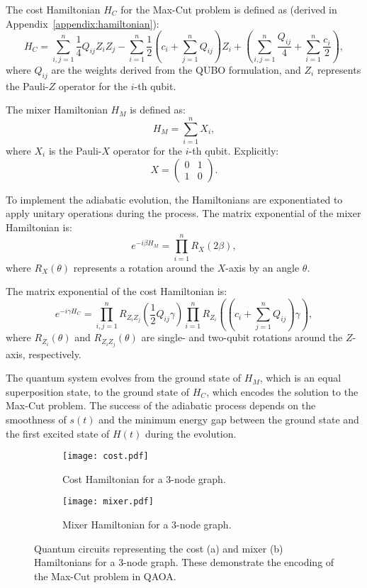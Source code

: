 \documentclass[12pt]{article}
\begin{document}
The cost Hamiltonian \( H_C \) for the Max-Cut problem is defined as (derived in Appendix~\ref{appendix:hamiltonian}):
\[
H_C = \sum_{i,j=1}^{n} \frac{1}{4} Q_{ij} Z_i Z_j 
- \sum_{i=1}^{n} \frac{1}{2} \left( c_i + \sum_{j=1}^{n} Q_{ij} \right) Z_i 
+ \left( \sum_{i,j=1}^{n} \frac{Q_{ij}}{4} + \sum_{i=1}^{n} \frac{c_i}{2} \right),
\]
where \( Q_{ij} \) are the weights derived from the QUBO formulation, and \( Z_i \) represents the Pauli-\( Z \) operator for the \( i \)-th qubit.



The mixer Hamiltonian \( H_M \) is defined as:
\[
H_M = \sum_{i=1}^n X_i,
\]
where \( X_i \) is the Pauli-\( X \) operator for the \( i \)-th qubit. Explicitly:
\[
X = \begin{pmatrix} 0 & 1 \\ 1 & 0 \end{pmatrix}.
\]



To implement the adiabatic evolution, the Hamiltonians are exponentiated to apply unitary operations during the process. The matrix exponential of the mixer Hamiltonian is:
\[
e^{-i \beta H_M} = \prod_{i=1}^n R_X(2 \beta),
\]
where \( R_X(\theta) \) represents a rotation around the \( X \)-axis by an angle \( \theta \).

The matrix exponential of the cost Hamiltonian is:
\[
e^{-i \gamma H_C} = \prod_{i,j=1}^n R_{Z_i Z_j} \left( \frac{1}{2} Q_{ij} \gamma \right) 
\prod_{i=1}^n R_{Z_i} \left( \left( c_i + \sum_{j=1}^n Q_{ij} \right) \gamma \right),
\]
where \( R_{Z_i}(\theta) \) and \( R_{Z_i Z_j}(\theta) \) are single- and two-qubit rotations around the \( Z \)-axis, respectively.


The quantum system evolves from the ground state of \( H_M \), which is an equal superposition state, to the ground state of \( H_C \), which encodes the solution to the Max-Cut problem. The success of the adiabatic process depends on the smoothness of \( s(t) \) and the minimum energy gap between the ground state and the first excited state of \( H(t) \) during the evolution.

\begin{figure}[h!]
    \centering
    \begin{subfigure}[b]{0.45\textwidth}
        \centering
        \texttt{[image: cost.pdf]}
        \caption{Cost Hamiltonian for a 3-node graph.}
        \label{fig:cost_hamiltonian}
    \end{subfigure}
    \hfill
    \begin{subfigure}[b]{0.45\textwidth}
        \centering
        \texttt{[image: mixer.pdf]}
        \caption{Mixer Hamiltonian for a 3-node graph.}
        \label{fig:mixer_hamiltonian}
    \end{subfigure}
    \caption{Quantum circuits representing the cost (a) and mixer (b) Hamiltonians for a 3-node graph. These demonstrate the encoding of the Max-Cut problem in QAOA.}
    \label{fig:hamiltonian_circuits}
\end{figure}
\newpage
\end{document}
